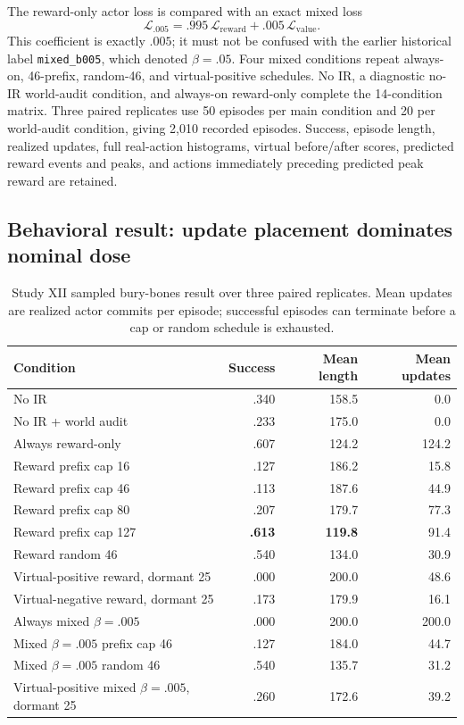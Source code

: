 \documentclass[10pt]{article}
\begin{document}
The reward-only actor loss is compared with an exact mixed loss
\begin{equation}
 \mathcal L_{.005}=.995\,\mathcal L_{\mathrm{reward}}
                   +.005\,\mathcal L_{\mathrm{value}}.
\end{equation}
This coefficient is exactly $.005$; it must not be confused with the earlier
historical label \texttt{mixed\_b005}, which denoted $\beta=.05$. Four mixed
conditions repeat always-on, 46-prefix, random-46, and virtual-positive
schedules. No IR, a diagnostic no-IR world-audit condition, and always-on
reward-only complete the 14-condition matrix. Three paired replicates use 50
episodes per main condition and 20 per world-audit condition, giving 2,010
recorded episodes. Success, episode length, realized updates, full real-action
histograms, virtual before/after scores, predicted reward events and peaks, and
actions immediately preceding predicted peak reward are retained.

\subsection{Behavioral result: update placement dominates nominal dose}

\begin{table}[H]
\centering
\scriptsize
\caption{Study XII sampled bury-bones result over three paired replicates. Mean updates are realized actor commits per episode; successful episodes can terminate before a cap or random schedule is exhausted.}
\label{tab:stage5b2aall}
\begin{tabular}{lrrr}
\toprule
Condition & Success & Mean length & Mean updates \\
\midrule
No IR & .340 & 158.5 & 0.0 \\
No IR + world audit & .233 & 175.0 & 0.0 \\
Always reward-only & .607 & 124.2 & 124.2 \\
Reward prefix cap 16 & .127 & 186.2 & 15.8 \\
Reward prefix cap 46 & .113 & 187.6 & 44.9 \\
Reward prefix cap 80 & .207 & 179.7 & 77.3 \\
Reward prefix cap 127 & \textbf{.613} & \textbf{119.8} & 91.4 \\
Reward random 46 & .540 & 134.0 & 30.9 \\
Virtual-positive reward, dormant 25 & .000 & 200.0 & 48.6 \\
Virtual-negative reward, dormant 25 & .173 & 179.9 & 16.1 \\
Always mixed $\beta=.005$ & .000 & 200.0 & 200.0 \\
Mixed $\beta=.005$ prefix cap 46 & .127 & 184.0 & 44.7 \\
Mixed $\beta=.005$ random 46 & .540 & 135.7 & 31.2 \\
Virtual-positive mixed $\beta=.005$, dormant 25 & .260 & 172.6 & 39.2 \\
\bottomrule
\end{tabular}
\end{table}
\end{document}
